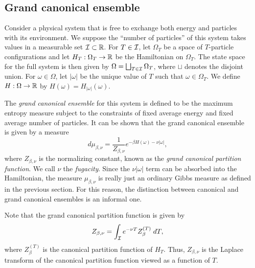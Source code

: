 
\subsection{Grand canonical ensemble}

Consider a physical system that is free to exchange both energy and particles with its environment. We suppose the ``number of particles'' of this system takes values in a measurable set $\mathcal{I} \subset {\mathbb R}$. For $T \in \mathcal{I}$, let $\Omega_T$ be a space
of $T$-particle configurations and let $H_T : \Omega_T \rightarrow {\mathbb R}$ be the Hamiltonian on
$\Omega_T$. The state space for the full system is then given by
$\Omega = \bigsqcup_{T \in \mathcal{I}} \Omega_T$, where $\sqcup$ denotes the disjoint union.
For $\omega\in\Omega$, let $|\omega|$ be the unique value of $T$ such that
$\omega \in \Omega_T$. We define $H : \Omega \rightarrow {\mathbb R}$ by
$H(\omega) = H_{|\omega|}(\omega)$.

The \emph{grand canonical ensemble} for this system is defined to be the maximum entropy measure
subject to the constraints of fixed average energy and fixed average number of particles. It can
be shown that the grand canonical ensemble is given by a measure
\begin{equation}
d\mu_{\beta,\nu}
  =
\frac{1}{Z_{\beta,\nu}} e^{-\beta H(\omega) - \nu |\omega|},
\end{equation}
where $Z_{\beta,\nu}$ is the normalizing constant, known as the \emph{grand canonical partition function}. We call $\nu$ the \emph{fugacity}. Since the
$\nu |\omega|$ term can be absorbed into the Hamiltonian, the measure $\mu_{\beta,\nu}$ is really just an ordinary Gibbs measure as defined in the previous section. For this reason, the distinction between canonical and grand canonical ensembles is an informal one.

\begin{rk}
Note that the grand canonical partition function is given by
\begin{equation}
Z_{\beta,\nu}
  =
\int_{\mathcal{I}} e^{-\nu T} Z_\beta^{(T)} \; dT,
\end{equation}
where $Z^{(T)}_\beta$ is the canonical partition function of $H_T$.
Thus, $Z_{\beta,\nu}$ is the Laplace transform of the canonical partition function
viewed as a function of $T$.
\end{rk}


